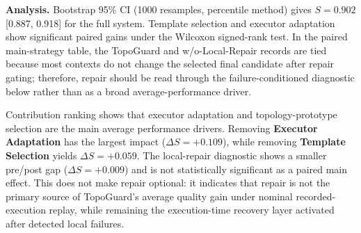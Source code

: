 \documentclass[acmsmall,review,anonymous]{acmart}
\begin{document}
\begin{table}[t]
\centering
\caption{Core module analysis on Water QA. $\Delta S$ denotes the quality difference between the full system and each variant. Local repair is an integral execution-time component of TopoGuard, but its measured effect is failure-conditioned; the row is therefore a diagnostic baseline rather than a broad paired main-effect ablation.}
\label{tab:ablation_repair}
\end{table}

\textbf{Analysis.} Bootstrap 95\% CI (1000 resamples, percentile method) gives $S=0.902$ [0.887, 0.918] for the full system. Template selection and executor adaptation show significant paired gains under the Wilcoxon signed-rank test. In the paired main-strategy table, the TopoGuard and w/o-Local-Repair records are tied because most contexts do not change the selected final candidate after repair gating; therefore, repair should be read through the failure-conditioned diagnostic below rather than as a broad average-performance driver.

Contribution ranking shows that executor adaptation and topology-prototype selection are the main average performance drivers. Removing \textbf{Executor Adaptation} has the largest impact ($\Delta S=+0.109$), while removing \textbf{Template Selection} yields $\Delta S=+0.059$. The local-repair diagnostic shows a smaller pre/post gap ($\Delta S=+0.009$) and is not statistically significant as a paired main effect. This does not make repair optional: it indicates that repair is not the primary source of TopoGuard's average quality gain under nominal recorded-execution replay, while remaining the execution-time recovery layer activated after detected local failures.
\end{document}
